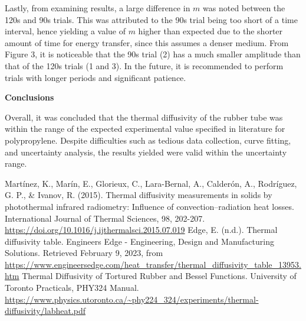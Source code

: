 \documentclass[11pt]{article}
\begin{document}
\begin{multicols}{2}
    Lastly, from examining results, a large difference in $m$ was noted between the 120s and 90s trials. This was attributed to the 90s trial being too short of a time interval, hence yielding a value of $m$ higher than expected due to the shorter amount of time for energy transfer, since this assumes a denser medium. From Figure 3, it is noticeable that the 90s trial (2) has a much smaller amplitude than that of the 120s trials (1 and 3). In the future, it is recommended to perform trials with longer periods and significant patience.   


    \vspace{10pt}

     \selectfont \textbf{Conclusions}
    
     \selectfont Overall, it was concluded that the thermal diffusivity of the rubber tube was within the range of the expected experimental value specified in literature for polypropylene. Despite difficulties such as tedious data collection, curve fitting, and uncertainty analysis, the results yielded were valid within the uncertainty range.    



\end{multicols}

    \vspace{10pt}
     
     \selectfont

    \begin{thebibliography}{} \selectfont
         Martínez, K., Marín, E., Glorieux, C., Lara-Bernal, A., Calderón, A., Rodríguez, G. P., \& Ivanov, R. (2015). Thermal diffusivity measurements in solids by photothermal infrared radiometry: Influence of convection–radiation heat losses. International Journal of Thermal Sciences, 98, 202-207.
                    \color{blue}\url{https://doi.org/10.1016/j.ijthermalsci.2015.07.019}\color{black}
         Edge, E. (n.d.). Thermal diffusivity table. Engineers Edge - Engineering, Design and Manufacturing Solutions. Retrieved February 9, 2023, from 
                    \color{blue}\url{https://www.engineersedge.com/heat_transfer/thermal_diffusivity_table_13953.htm} \color{black}
         Thermal Diffusivity of Tortured Rubber and Bessel Functions. University of Toronto Practicals, PHY324 Manual. 
                    \color{blue}\url{https://www.physics.utoronto.ca/~phy224_324/experiments/thermal-diffusivity/labheat.pdf}\color{black}
    \end{thebibliography}
\end{document}

